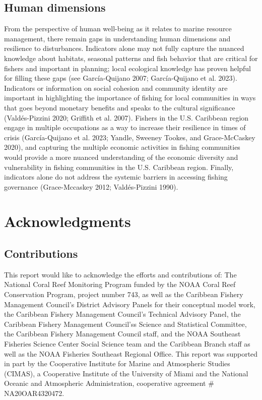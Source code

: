 \documentclass[
  letterpaper,
  oneside,
  open=any]{scrbook}
\begin{document}
\section{Human dimensions}\label{human-dimensions}

From the perspective of human well-being as it relates to marine
resource management, there remain gaps in understanding human dimensions
and resilience to disturbances. Indicators alone may not fully capture
the nuanced knowledge about habitats, seasonal patterns and fish
behavior that are critical for fishers and important in planning; local
ecological knowledge has proven helpful for filling these gaps (see
García-Quijano 2007; García-Quijano et al. 2023). Indicators or
information on social cohesion and community identity are important in
highlighting the importance of fishing for local communities in ways
that goes beyond monetary benefits and speaks to the cultural
significance (Valdés-Pizzini 2020; Griffith et al. 2007). Fishers in the
U.S. Caribbean region engage in multiple occupations as a way to
increase their resilience in times of crisis (García-Quijano et al.
2023; Yandle, Sweeney Tookes, and Grace-McCaskey 2020), and capturing
the multiple economic activities in fishing communities would provide a
more nuanced understanding of the economic diversity and vulnerability
in fishing communities in the U.S. Caribbean region. Finally, indicators
alone do not address the systemic barriers in accessing fishing
governance (Grace-Mccaskey 2012; Valdés-Pizzini 1990).


\chapter{Acknowledgments}\label{acknowledgments}

\section{Contributions}\label{contributions}

This report would like to acknowledge the efforts and contributions of:
The National Coral Reef Monitoring Program funded by the NOAA Coral Reef
Conservation Program, project number 743, as well as the Caribbean
Fishery Management Council's District Advisory Panels for their
conceptual model work, the Caribbean Fishery Management Council's
Technical Advisory Panel, the Caribbean Fishery Management Council'ss
Science and Statistical Committee, the Caribbean Fishery Management
Council staff, and the NOAA Southeast Fisheries Science Center Social
Science team and the Caribbean Branch staff as well as the NOAA
Fisheries Southeast Regional Office. This report was supported in part
by the Cooperative Institute for Marine and Atmospheric Studies (CIMAS),
a Cooperative Institute of the University of Miami and the National
Oceanic and Atmospheric Administration, cooperative agreement \#
NA20OAR4320472.
\end{document}
